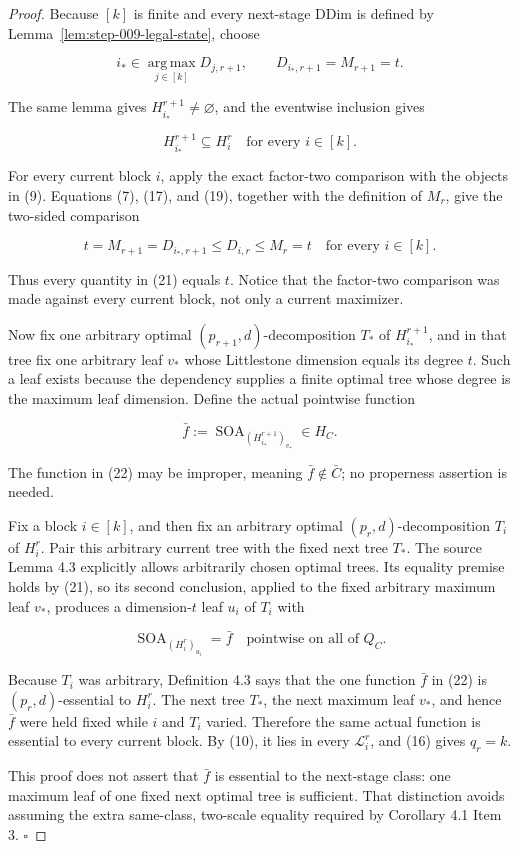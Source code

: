 \begin{proof}
Because \([k]\) is finite and every next-stage DDim is defined by
Lemma~\ref{lem:step-009-legal-state}, choose

\[
 i_*\in\operatorname*{arg\,max}_{j\in[k]}D_{j,r+1},
 \qquad
 D_{i_*,r+1}=M_{r+1}=t.
 \tag{19}
\]

The same lemma gives \(H_{i_*}^{r+1}\ne\varnothing\), and the 
eventwise inclusion gives

\[
 H_{i_*}^{r+1}\subseteq H_i^r
 \quad\text{for every }i\in[k].
 \tag{20}
\]

For every current block \(i\), apply the exact factor-two comparison with
the objects in (9). Equations (7), (17), and (19), together with the
definition of \(M_r\), give the two-sided comparison

\[
 t=M_{r+1}=D_{i_*,r+1}
 \le D_{i,r}
 \le M_r=t
 \quad\text{for every }i\in[k].
 \tag{21}
\]

Thus every quantity in (21) equals \(t\). Notice that the factor-two
comparison was made against every current block, not only a current
maximizer.

Now fix one arbitrary optimal \((p_{r+1},d)\)-decomposition
\(T_*\) of \(H_{i_*}^{r+1}\), and in that tree fix one arbitrary leaf
\(v_*\) whose Littlestone dimension equals its degree \(t\). Such a leaf
exists because the  dependency supplies a finite optimal tree
whose degree is the maximum leaf dimension. Define the actual pointwise
function

\[
 \bar f:=\operatorname{SOA}_{(H_{i_*}^{r+1})_{v_*}}
 \in H_C.
 \tag{22}
\]

The function in (22) may be improper, meaning \(\bar f\notin\bar C\); no
properness assertion is needed.

Fix a block \(i\in[k]\), and then fix an arbitrary optimal
\((p_r,d)\)-decomposition \(T_i\) of \(H_i^r\). Pair this arbitrary current
tree with the fixed next tree \(T_*\). The source Lemma 4.3 explicitly
allows arbitrarily chosen optimal trees. Its equality premise holds by
(21), so its second conclusion, applied to the fixed arbitrary maximum
leaf \(v_*\), produces a dimension-\(t\) leaf \(u_i\) of \(T_i\) with

\[
 \operatorname{SOA}_{(H_i^r)_{u_i}}=\bar f
 \quad\text{pointwise on all of }Q_C.
 \tag{23}
\]

Because \(T_i\) was arbitrary, Definition 4.3 says that the one function
\(\bar f\) in (22) is \((p_r,d)\)-essential to \(H_i^r\). The next tree
\(T_*\), the next maximum leaf \(v_*\), and hence \(\bar f\) were held
fixed while \(i\) and \(T_i\) varied. Therefore the same actual function
is essential to every current block. By (10), it lies in every
\(\mathcal L_i^r\), and (16) gives \(q_r=k\).

This proof does not assert that \(\bar f\) is essential to the next-stage
class: one maximum leaf of one fixed next optimal tree is sufficient. That
distinction avoids assuming the extra same-class, two-scale equality
required by Corollary 4.1 Item 3. \(\square\)


\end{proof}

